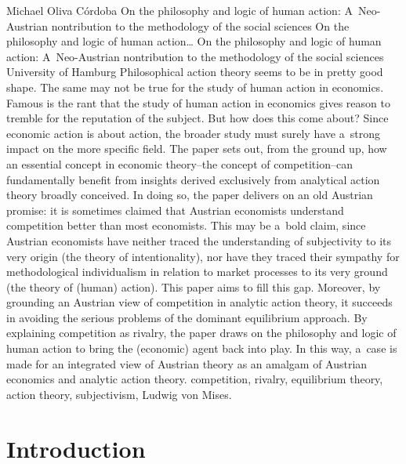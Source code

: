 \begin{artengenv}{Michael Oliva Córdoba}
	{On the philosophy and logic of human action: A~Neo-Austrian nontribution to the methodology of the social sciences}
	{On the philosophy and logic of human action\ldots}
	{On the philosophy and logic of human action: A~Neo-Austrian nontribution to the methodology of the social sciences}
	{
	University of Hamburg}
	{Philosophical action theory seems to be in pretty good shape. The same may not be true for the study of human action in economics. Famous is the rant that the study of human action in economics gives reason to tremble for the reputation of the subject. But how does this come about? Since economic action is about action, the broader study must surely have a~strong impact on the more specific field. The paper sets out, from the ground up, how an essential concept in economic theory–the concept of competition–can fundamentally benefit from insights derived exclusively from analytical action theory broadly conceived. In doing so, the paper delivers on an old Austrian promise: it is sometimes claimed that Austrian economists understand competition better than most economists. This may be a~bold claim, since Austrian economists have neither traced the understanding of subjectivity to its very origin (the theory of intentionality), nor have they traced their sympathy for methodological individualism in relation to market processes to its very ground (the theory of (human) action). This paper aims to fill this gap. Moreover, by grounding an Austrian view of competition in analytic action theory, it succeeds in avoiding the serious problems of the dominant equilibrium approach. By explaining competition as rivalry, the paper draws on the philosophy and logic of human action to bring the (economic) agent back into play. In this way, a~case is made for an integrated view of Austrian theory as an amalgam of Austrian economics and analytic action theory.
	}
	{competition, rivalry, equilibrium theory, action theory, subjectivism, Ludwig von Mises.}




\section{Introduction}


\end{artengenv}

